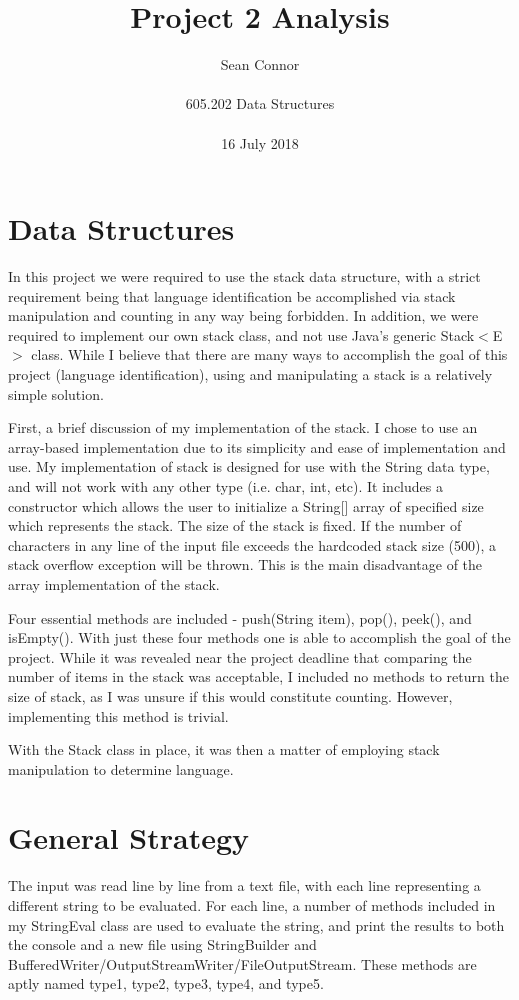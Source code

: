 \documentclass[12pt, titlepage]{article}
\title{Project 2 Analysis}
\author{Sean Connor \\ \\ 605.202 Data Structures \\ \\ 16 July 2018}
\date{}
\begin{document}
\maketitle

\section {Data Structures}

In this project we were required to use the stack data structure, with a strict requirement being that language identification be accomplished via stack manipulation and counting in any way being forbidden. In addition, we were required to implement our own stack class, and not use Java's generic Stack$<$E$>$ class. While I believe that there are many ways to accomplish the goal of this project (language identification), using and manipulating a stack is a relatively simple solution.

First, a brief discussion of my implementation of the stack. I chose to use an array-based implementation due to its simplicity and ease of implementation and use. My implementation of stack is designed for use with the String data type, and will not work with any other type (i.e. char, int, etc). It includes a constructor which allows the user to initialize a String[] array of specified size which represents the stack. The size of the stack is fixed. If the number of characters in any line of the input file exceeds the hardcoded stack size (500), a stack overflow exception will be thrown. This is the main disadvantage of the array implementation of the stack.

Four essential methods are included - push(String item), pop(), peek(), and isEmpty(). With just these four methods one is able to accomplish the goal of the project. While it was revealed near the project deadline that comparing the number of items in the stack was acceptable, I included no methods to return the size of stack, as I was unsure if this would constitute counting. However, implementing this method is trivial.

With the Stack class in place, it was then a matter of employing stack manipulation to determine language.

\section{General Strategy}

The input was read line by line from a text file, with each line representing a different string to be evaluated. For each line, a number of methods included in my StringEval class are used to evaluate the string, and print the results to both the console and a new file using StringBuilder and BufferedWriter/OutputStreamWriter/FileOutputStream. These methods are aptly named type1, type2, type3, type4, and type5. 
\end{document}
